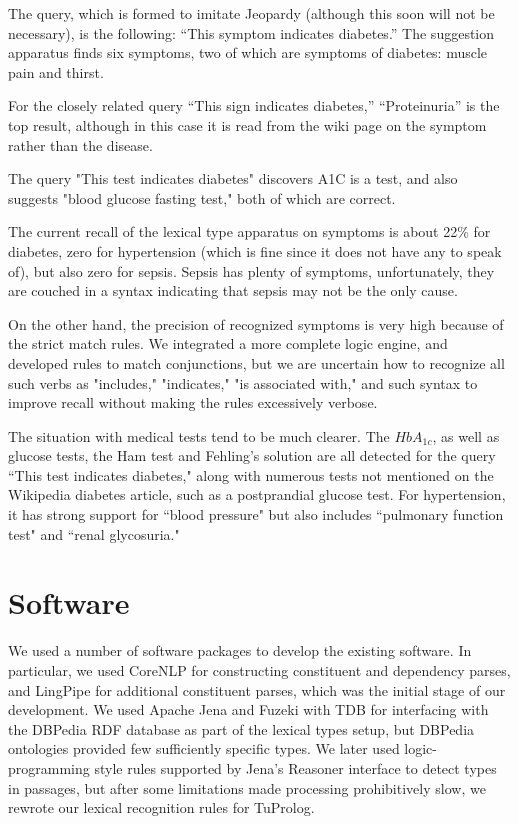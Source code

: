 \documentclass[12pt,letterpaper]{article}
\begin{document}
The query, which is formed to imitate Jeopardy (although this soon will not be necessary), is the following: ``This symptom indicates 
diabetes.'' The suggestion apparatus finds six symptoms, two of which are symptoms of diabetes: muscle pain and thirst.

For the closely related query ``This sign indicates diabetes,'' ``Proteinuria'' is the top result, although in this case it is read from the wiki page on the symptom rather than the disease.

The query "This test indicates diabetes" discovers A1C is a test, and also suggests "blood glucose fasting test," both of which are correct.

The current recall of the lexical type apparatus on symptoms is about 22\% for diabetes, zero for hypertension (which is fine since it does not have any to speak of), but also zero for sepsis. Sepsis has plenty of symptoms, unfortunately, they are couched in a syntax indicating that sepsis may not be the only cause.

On the other hand, the precision of recognized symptoms is very high because of the strict match rules. We integrated a more complete logic engine, and developed rules to match conjunctions, but we are uncertain how to recognize all such verbs as "includes," "indicates," "is associated with," and such syntax to improve recall without making the rules excessively verbose. 

The situation with medical tests tend to be much clearer. The $HbA_{1c}$, as well as glucose tests, the Ham test and Fehling's solution are all detected for the query ``This test indicates diabetes," along with numerous tests not mentioned on the Wikipedia diabetes article, such as a postprandial glucose test. For hypertension, it has strong support for ``blood pressure" but also includes ``pulmonary function test" and ``renal glycosuria."

\section{Software}

We used a number of software packages to develop the existing software. In particular, we used CoreNLP \cite{manning-EtAl:2014:P14-5} for constructing constituent and dependency parses, and LingPipe for additional constituent parses, which was the initial stage of our development.
We used Apache Jena and Fuzeki with TDB for interfacing with the DBPedia RDF database as part of the lexical types setup, but DBPedia ontologies provided few sufficiently specific types. We later used logic-programming style rules supported by Jena's Reasoner interface to detect types in passages, but after some limitations made processing prohibitively slow, we rewrote our lexical recognition rules for TuProlog. 
\end{document}
